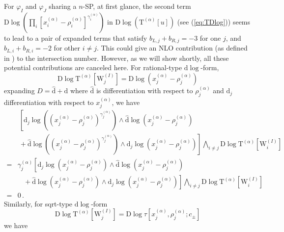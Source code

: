 \documentclass[a4paper,11pt]{article}
\newcommand{\nn}{\nonumber}
\newcommand{\nd}{\mathrm{d}}
\newcommand{\nD}{\mathrm{D}}
\newcommand{\nT}{\mathrm{T}}
\newcommand{\nW}{\mathrm{W}}
\newcommand{\nds}{\hat{\mathrm{d}}}
\def\eref#1{(\ref{#1})}
\begin{document}
For $\varphi_I$ and $\varphi_J$ sharing a $n$-SP,  at first glance,  the second term  $\nD \log \left(\prod_i \left[ x_i^{(\alpha)} - \rho_i^{(\alpha)} \right]^{\gamma_i^{(\alpha)}} \right)$ in $\nD \log \left( \nT^{(\alpha)} [u] \right)$ (see \eref{eq:TDlog})  seems to lead to a pair of expanded terms that satisfy $b_{L,j}+b_{R,j}=-3$ for one $j$, and $b_{L,i}+b_{R,i}=-2$ for other $i\neq j$. 
This could give an NLO contribution (as defined in \cite{Chen:2023kgw}) to the intersection number. However, as we will show shortly, all these potential contributions are canceled here. For rational-type $\nd \log$-form,
\begin{equation}
\nD \log \nT^{(\alpha)}\left[\nW^{(I)}_j \right] = \nD \log \left(x_j^{(\alpha)}-\rho_j^{(\alpha)}\right)
\end{equation} 
expanding $D=\nds+\nd$ where  $\nds$ is differentiation with respect to $\rho_j^{(\alpha)}$ and $\nd_j$  differentiation with respect to $x_j^{(\alpha)}$, we have
\begin{align}
& ~\left[ \nd_{j} \log \left(\left( x_j^{(\alpha)} - \rho_j^{(\alpha)} \right)^{\gamma_j^{(\alpha)}} \right) 
\wedge \nds \log \left( x_j^{(\alpha)} - \rho_j^{(\alpha)} \right)  \right. \nn\\
&\left. ~ + \nds \log \left( \left( x_j^{(\alpha)} - \rho_j^{(\alpha)} \right)^{\gamma_j^{(\alpha)}} \right) 
\wedge \nd_j \log \left( x_j^{(\alpha)} - \rho_j^{(\alpha)} \right)  \right]   \bigwedge_{i\neq j}\nD \log \nT^{(\alpha)}\left[\nW^{(I)}_i \right]   \nn\\
= & \gamma_j^{(\alpha)} \left[ \nd_{j} \log \left( x_j^{(\alpha)} - \rho_j^{(\alpha)} \right)   
\wedge \nds \log \left( x_j^{(\alpha)} - \rho_j^{(\alpha)} \right) \right. \nn\\
&\left. ~~~~ + \nds \log \left( x_j^{(\alpha)} - \rho_j^{(\alpha)} \right)\wedge \nd_j \log \left( x_j^{(\alpha)} - \rho_j^{(\alpha)} \right)  \right]   \bigwedge_{i\neq j}\nD \log \nT^{(\alpha)}\left[\nW^{(I)}_i \right]   \nn\\
=&0 \, .
\end{align}
Similarly, for sqrt-type $\nd \log$-form 
\begin{equation}
\nD \log \nT^{(\alpha)}\left[\nW^{(I)}_j \right] = \nD \log \tau\left[x_j^{(\alpha)} ,\rho_j^{(\alpha)};c_{\pm} \right]
\end{equation} 
we have
\end{document}
